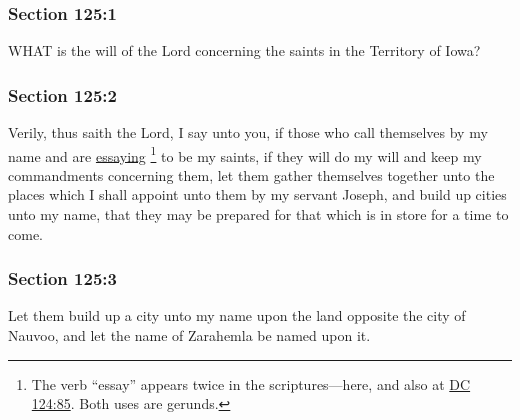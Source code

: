 	\subsubsection{Section 125:1} %
		\label{DC125-1}

		WHAT is the will of the Lord concerning the saints in the Territory of Iowa?


	\subsubsection{Section 125:2} %
		\label{DC125-2}

		Verily, thus saith the Lord, I say unto you, if those who call themselves by my name and are \hyperref[ESSAY]{essaying}%
			\footnote{%
				The verb ``essay'' appears twice in the scriptures---here, and also at \hyperref[DC124-85]{DC 124:85}. Both uses are gerunds.
				}
		to be my saints, if they will do my will and keep my commandments concerning them, let them gather themselves together unto the places which I shall appoint unto them by my servant Joseph, and build up cities unto my name, that they may be prepared for that which is in store for a time to come.


	\subsubsection{Section 125:3} %
		\label{DC125-3}

		Let them build up a city unto my name upon the land opposite the city of Nauvoo, and let the name of Zarahemla be named upon it.

